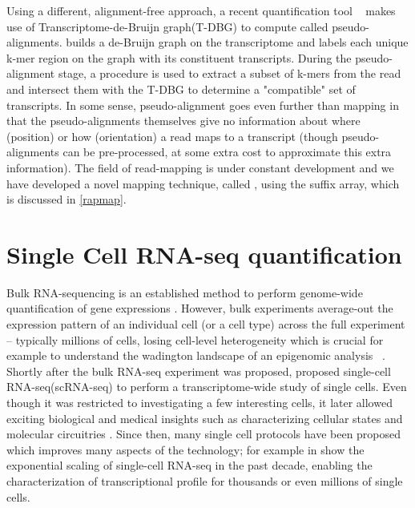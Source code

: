 Using a different, alignment-free approach, a recent quantification tool \kallisto~\citep{kallisto} makes use of Transcriptome-de-Bruijn graph(T-DBG) to compute called pseudo-alignments. \kallisto builds a de-Bruijn graph on the transcriptome and labels each unique k-mer region on the graph with its constituent transcripts. During the pseudo-alignment stage, a procedure is used to extract a subset of k-mers from the read and intersect them with the T-DBG to determine a "compatible" set of transcripts. In some sense, pseudo-alignment goes even further than mapping in that the pseudo-alignments themselves give no information about where (position) or how (orientation) a read maps to a transcript (though pseudo-alignments can be pre-processed, at some extra cost to approximate this extra information). The field of read-mapping is under constant development and we have developed a novel mapping technique, called \qm, using the suffix array, which is discussed in \cref{rapmap}.

\section{Single Cell RNA-seq quantification} 
\label{intro:singlecell}

Bulk RNA-sequencing is an established method to perform genome-wide quantification of gene expressions \citep{mortazavi2008mapping}. However, bulk experiments average-out the expression pattern of an individual cell (or a cell type) across the full experiment -- typically millions of cells, losing cell-level heterogeneity which is crucial for example to understand the wadington landscape of an epigenomic analysis ~\citep{goldberg2007epigenetics}. Shortly after the bulk RNA-seq experiment was proposed, \citet{tang2009mrna} proposed single-cell RNA-seq(scRNA-seq) to perform a transcriptome-wide study of single cells. Even though it was restricted to investigating a few interesting cells, it later allowed exciting biological and medical insights such as characterizing cellular states and molecular circuitries \citep{encode2012integrated}. Since then, many single cell protocols have been proposed which improves many aspects of the technology; for example in  \citep{svensson2018exponential} show the exponential scaling of single-cell RNA-seq in the past decade, enabling the characterization of transcriptional profile for thousands or even millions of single cells.


